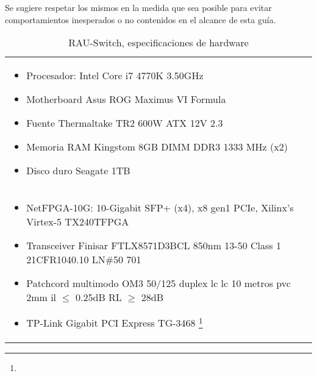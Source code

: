 Se sugiere respetar los mismos en la medida que sea posible para evitar comportamientos inesperados o no contenidos en el alcance de esta guía.\\

\begin{table}[h]\centering
\begin{tabularx}{\textwidth}{|>{\setlength\hsize{1.0\hsize}\setlength\linewidth{\hsize}}X|}
\hline
\multicolumn{1}{|c|}{Hardware}\\
\hline
\begin{itemize}
\item Procesador: Intel Core i7 4770K 3.50GHz
\item Motherboard Asus ROG Maximus VI Formula
\item Fuente Thermaltake TR2 600W ATX 12V 2.3
\item Memoria RAM Kingstom 8GB DIMM DDR3 1333 MHz (x2)
\item Disco duro Seagate 1TB
\end{itemize}\\

\begin{itemize}
\item NetFPGA-10G: 10-Gigabit SFP+ (x4), x8 gen1 PCIe, Xilinx’s Virtex-5 TX240TFPGA
\item Transceiver Finisar FTLX8571D3BCL 850nm 13-50
	  Class 1 21CFR1040.10 LN\#50 7\/01
\item Patchcord multimodo OM3 50/125 duplex lc lc 10 metros pvc 2mm
	  il $\leq$ 0.25dB RL $\geq$ 28dB
\item TP-Link Gigabit PCI Express TG-3468 \footnote{}

\end{itemize}\\
\hline
\end{tabularx}
\caption{RAU-Switch, especificaciones de hardware}
\label{table:RAUHSpecs}
\end{table}




